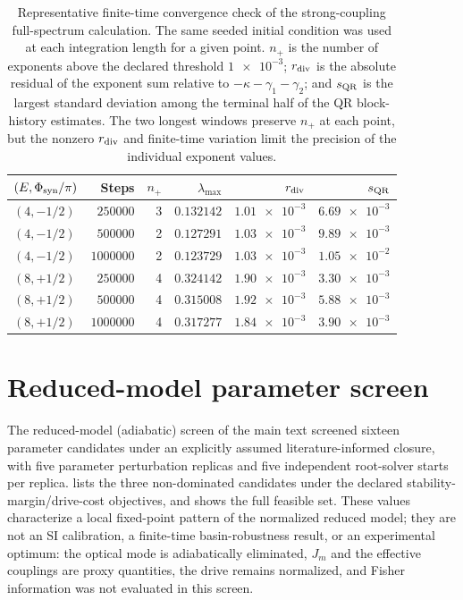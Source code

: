 \documentclass[aip,cha,reprint]{revtex4-2}
\begin{document}
\begin{table}[h]
  \centering
  \caption{Representative finite-time convergence check of the strong-coupling
  full-spectrum calculation. The same seeded initial condition was used at each
  integration length for a given point. $n_{+}$ is the number of exponents above
  the declared threshold $\num{1e-3}$; $r_{\rm div}$ is the absolute residual of
  the exponent sum relative to $-\kappa-\gamma_1-\gamma_2$; and $s_{\rm QR}$ is
  the largest standard deviation among the terminal half of the QR block-history
  estimates. The two longest windows preserve $n_{+}$ at each point, but the
  nonzero $r_{\rm div}$ and finite-time variation limit the precision of the
  individual exponent values.}
  \label{tab:si-hyperchaos-convergence}
  \begin{tabular}{@{}lrrrrr@{}}
    \toprule
    $(E,\Phi_{\rm syn}/\pi)$ & Steps & $n_{+}$ & $\lambda_{\max}$ & $r_{\rm div}$ & $s_{\rm QR}$ \\
    \midrule
    $(4,-1/2)$ & $\num{250000}$ & 3 & $\num{0.132142}$ & $\num{1.01e-3}$ & $\num{6.69e-3}$ \\
    $(4,-1/2)$ & $\num{500000}$ & 2 & $\num{0.127291}$ & $\num{1.03e-3}$ & $\num{9.89e-3}$ \\
    $(4,-1/2)$ & $\num{1000000}$ & 2 & $\num{0.123729}$ & $\num{1.03e-3}$ & $\num{1.05e-2}$ \\
    $(8,+1/2)$ & $\num{250000}$ & 4 & $\num{0.324142}$ & $\num{1.90e-3}$ & $\num{3.30e-3}$ \\
    $(8,+1/2)$ & $\num{500000}$ & 4 & $\num{0.315008}$ & $\num{1.92e-3}$ & $\num{5.88e-3}$ \\
    $(8,+1/2)$ & $\num{1000000}$ & 4 & $\num{0.317277}$ & $\num{1.84e-3}$ & $\num{3.90e-3}$ \\
    \bottomrule
  \end{tabular}
\end{table}

\section{Reduced-model parameter screen}

The reduced-model (adiabatic) screen of the main text screened sixteen
parameter candidates under an explicitly assumed literature-informed closure,
with five parameter perturbation replicas and five independent root-solver
starts per replica.  lists the three non-dominated
candidates under the declared stability-margin/drive-cost objectives, and
 shows the full feasible set. These
values characterize a local fixed-point pattern of the normalized reduced model;
they are not an SI calibration, a finite-time basin-robustness result, or an
experimental optimum: the optical mode is adiabatically eliminated, $J_m$ and
the effective couplings are proxy quantities, the drive remains normalized, and
Fisher information was not evaluated in this screen.
\end{document}
